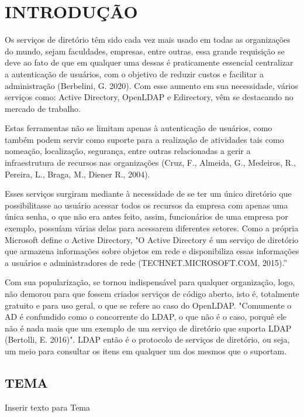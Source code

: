 \newpage

\section{INTRODUÇÃO}
\label{sec:introdução}
Os serviços de diretório têm sido cada vez mais usado em todas as
organizações do mundo, sejam faculdades, empresas, entre outras, essa
grande requisição se deve ao fato de que em qualquer uma dessas é praticamente essencial centralizar a autenticação de usuários, com o objetivo de reduzir custos e facilitar a administração (Berbelini, G. 2020). Com esse aumento em sua necessidade, vários serviços como: Active Directory, OpenLDAP e Edirectory, vêm se destacando no mercado de trabalho.

Estas ferramentas não se limitam apenas à autenticação de usuários, como também podem servir como suporte para a realização de atividades tais como nomeação, localização, segurança, entre outras relacionadas a gerir a infraestrutura de recursos nas organizações (Cruz, F., Almeida, G., Medeiros, R., Pereira, L., Braga, M., Diener R., 2004).

Esses serviços surgiram mediante à necessidade de se ter um único diretório que possibilitasse ao usuário acessar todos os recursos da empresa com apenas uma única senha, o que não era antes feito, assim, funcionários de uma empresa por exemplo, possuíam várias delas para acessarem diferentes setores. Como a própria Microsoft define o Active Directory, "O  Active  Directory é  um  serviço  de  diretório  que  armazena  informações sobre objetos em rede e disponibiliza essas informações a usuários e administradores de rede (TECHNET.MICROSOFT.COM, 2015).”

Com sua popularização, se tornou indispensável para qualquer organização, logo,  não demorou para que fossem criados serviços de código aberto, isto é, totalmente gratuito e para uso geral, o que se refere ao caso do OpenLDAP. "Comumente o AD é confundido como o concorrente do LDAP, o que não é o caso, porquê ele não é nada mais que um exemplo de um serviço de diretório que suporta LDAP (Bertolli, E. 2016)". LDAP então é o protocolo de serviços de diretório, ou seja, um meio para consultar os itens em qualquer um dos mesmos que o suportam.


\subsection{TEMA}
\label{subsec:tema}
Inserir texto para Tema



